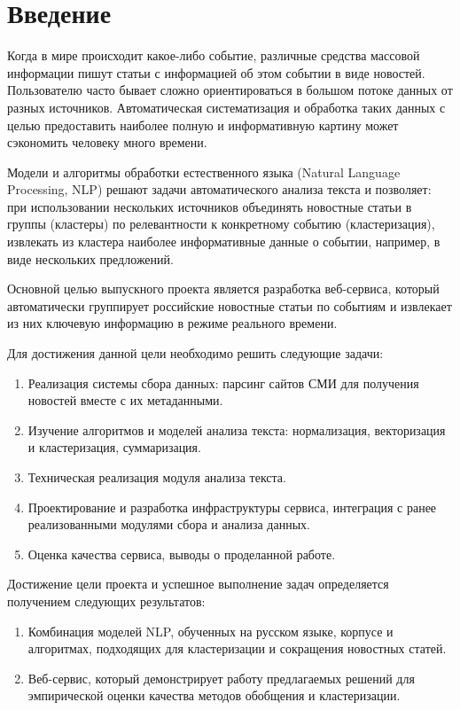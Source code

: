 \documentclass[a4paper, 14pt]{extarticle}
\begin{document}
\tableofcontents %
\clearpage

\section{Введение}

Когда в мире происходит какое-либо событие, различные средства массовой информации
пишут статьи с информацией об этом событии в виде новостей. Пользователю часто бывает сложно ориентироваться в большом потоке данных от разных источников. Автоматическая систематизация и обработка таких данных с целью предоставить наиболее полную и информативную картину может сэкономить человеку много времени. 

Модели и алгоритмы обработки естественного языка (Natural Language Processing, NLP) решают задачи автоматического анализа текста и позволяет: при использовании нескольких источников объединять новостные статьи в группы (кластеры) по релевантности к конкретному событию (кластеризация), извлекать из кластера наиболее информативные данные о событии, например, в виде нескольких предложений.

Основной целью выпускного проекта является разработка веб-сервиса, который автоматически
группирует российские новостные статьи по событиям и извлекает из них ключевую информацию в режиме реального времени. 

Для достижения данной цели необходимо решить следующие задачи:
\begin{enumerate}
	\item Реализация системы сбора данных: парсинг сайтов СМИ для получения новостей вместе с их метаданными.
	\item Изучение алгоритмов и моделей анализа текста: нормализация, векторизация и кластеризация, суммаризация.
	\item Техническая реализация модуля анализа текста.
	\item Проектирование и разработка инфраструктуры сервиса, интеграция с ранее реализованными модулями сбора и анализа данных.
	\item Оценка качества сервиса, выводы о проделанной работе.
\end{enumerate}

Достижение цели проекта и успешное выполнение задач определяется получением следующих результатов:
\begin{enumerate}
	\item Комбинация моделей NLP, обученных на русском языке, корпусе и
	алгоритмах, подходящих для кластеризации и сокращения новостных статей.
	\item Веб-сервис, который демонстрирует работу предлагаемых решений для
	эмпирической оценки качества методов обобщения и кластеризации.
\end{enumerate}
\end{document}

